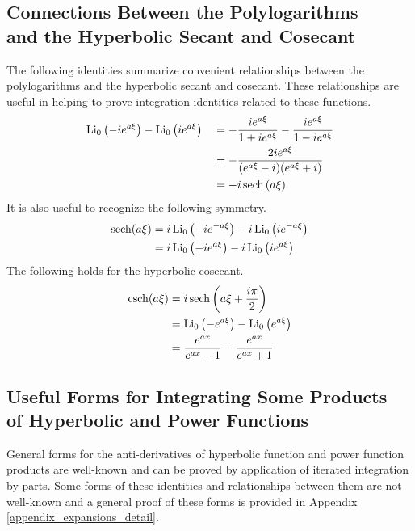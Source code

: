 \subsection[Connections Between the Polylogarithms and the Hyperbolic Secant]{Connections Between the Polylogarithms\\and the Hyperbolic Secant and Cosecant}
The following identities summarize convenient relationships between the polylogarithms and the hyperbolic secant and cosecant.  These relationships are useful in helping to prove integration identities related to these functions.
\begin{align}
	\operatorname{Li}_0\left(-ie^{a\xi}\right) - \operatorname{Li}_0\left(ie^{a\xi}\right)
	\quad&= -\frac{ie^{a\xi}}{1 + i e^{a\xi}} - \frac{ie^{a\xi}}{1 - ie^{a\xi}} \\
	\quad&= -\frac{2ie^{a\xi}}{(e^{a\xi} - i)(e^{a\xi} + i)} \\
	\quad&= -i\operatorname{sech}\left(a\xi\right)
\end{align}
It is also useful to recognize the following symmetry.
\begin{align}
	\operatorname{sech}(a\xi) &= i\operatorname{Li}_0\left(-ie^{-a\xi}\right) - i\operatorname{Li}_0\left(ie^{-a\xi}\right) \\
	&= i\operatorname{Li}_0\left(-ie^{a\xi}\right) - i\operatorname{Li}_0\left(ie^{a\xi}\right)
\end{align}
The following holds for the hyperbolic cosecant.
\begin{align}
	\operatorname{csch}(a\xi) &= i\operatorname{sech}\left(a\xi + \frac{i\pi}{2}\right) \\
	&= \operatorname{Li}_0\left(-e^{a\xi}\right) - \operatorname{Li}_0\left(e^{a\xi}\right) \\
	&= \frac{e^{ax}}{e^{ax} - 1} - \frac{e^{ax}}{e^{ax} + 1}
\end{align}


\subsection[Hyperbolic and Power Function Products]{Useful Forms for Integrating Some Products\\of Hyperbolic and Power Functions}
General forms for the anti-derivatives of hyperbolic function and power function products are well-known and can be proved by application of iterated integration by parts.  Some forms of these identities and relationships between them are not well-known and a general proof of these forms is provided in Appendix \ref{appendix_expansions_detail}. 
